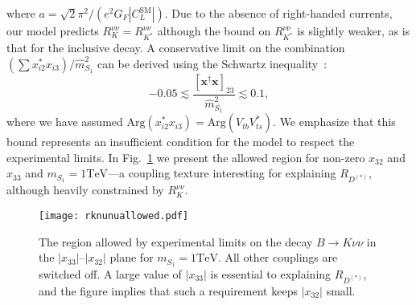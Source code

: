 where $a = \sqrt{2} \pi^2 / (e^2 G_F |C_L^{\text{SM}}|)$. Due to the absence of
right-handed currents, our model predicts $R_K^{\nu\nu}=R_{K^{*}}^{\nu\nu}$
although the bound on $R_{K^{*}}^{\nu\nu}$ is slightly weaker, as is that for
the inclusive decay. A conservative limit on the combination $(\sum x^*_{i 2}
x_{i 3})/\hat{m}^2_{S_{1}}$ can be derived using the Schwartz
inequality~\cite{Bauer:2015knc}:
\begin{equation} \label{eq:ch3-bnunucond}
  -0.05 \lesssim \frac{[\mathbf{x}^\dagger \mathbf{x}]_{23}}{\hat{m}^2_{S_{1}}} \lesssim 0.1,
\end{equation}
where we have assumed $\text{Arg}(x_{i2}^*x_{i3}) = \text{Arg}(V_{tb}V_{ts}^*)$.
We emphasize that this bound represents an insufficient condition for the model
to respect the experimental limits. In Fig.~\ref{fig:ch3-rknunuallowed} we present
the allowed region for non-zero $x_{32}$ and $x_{33}$ and $m_{S_{1}} = 1 \text{
  TeV}$---a coupling texture interesting for explaining $R_{D^{(*)}}$, although
heavily constrained by $R_K^{\nu\nu}$.

\begin{figure}[t]
  \centering \texttt{[image: rknunuallowed.pdf]}
  \caption[The region allowed by experimental limits on the decay
  $B \to K \nu \nu$ in the $|x_{33}|$--$|x_{32}|$ plane for $m_{S_{1}} = 1 \text{
    TeV}$.]{The region allowed by experimental limits on the decay
    $B \to K \nu \nu$ in the $|x_{33}|$--$|x_{32}|$ plane for $m_{S_{1}} = 1 \text{
      TeV}$. All other couplings are switched off. A large value of $|x_{33}|$
    is essential to explaining $R_{D^{(*)}}$, and the figure implies that such a
    requirement keeps $|x_{32}|$ small.}
  \label{fig:ch3-rknunuallowed}
\end{figure}

